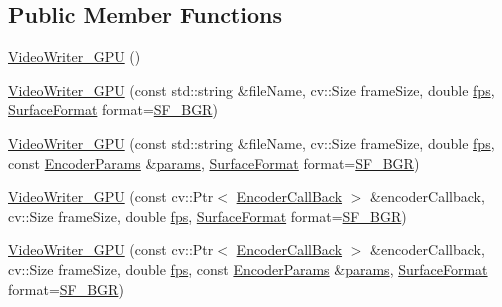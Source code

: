 \subsection*{Public Member Functions}
\begin{DoxyCompactItemize}
\item 
\hyperlink{classcv_1_1gpu_1_1VideoWriter__GPU_a79dc0841ea1d709707c4c2dde8bb725c}{Video\-Writer\-\_\-\-G\-P\-U} ()
\item 
\hyperlink{classcv_1_1gpu_1_1VideoWriter__GPU_a97be453ffdabdc7e8b0e920ec0282e05}{Video\-Writer\-\_\-\-G\-P\-U} (const std\-::string \&file\-Name, cv\-::\-Size frame\-Size, double \hyperlink{highgui__c_8h_adbca5b692e9ace76ccf02d9c621ee228}{fps}, \hyperlink{classcv_1_1gpu_1_1VideoWriter__GPU_ada559c518c52735d64366823e897e8db}{Surface\-Format} format=\hyperlink{classcv_1_1gpu_1_1VideoWriter__GPU_ada559c518c52735d64366823e897e8dba7177ece8afd220ce60266029e5b12da8}{S\-F\-\_\-\-B\-G\-R})
\item 
\hyperlink{classcv_1_1gpu_1_1VideoWriter__GPU_a886f388a86fc1858d76cb2c67f44e6ea}{Video\-Writer\-\_\-\-G\-P\-U} (const std\-::string \&file\-Name, cv\-::\-Size frame\-Size, double \hyperlink{highgui__c_8h_adbca5b692e9ace76ccf02d9c621ee228}{fps}, const \hyperlink{structcv_1_1gpu_1_1VideoWriter__GPU_1_1EncoderParams}{Encoder\-Params} \&\hyperlink{compat_8hpp_a0480a03ecc41b20cde376602531d9270}{params}, \hyperlink{classcv_1_1gpu_1_1VideoWriter__GPU_ada559c518c52735d64366823e897e8db}{Surface\-Format} format=\hyperlink{classcv_1_1gpu_1_1VideoWriter__GPU_ada559c518c52735d64366823e897e8dba7177ece8afd220ce60266029e5b12da8}{S\-F\-\_\-\-B\-G\-R})
\item 
\hyperlink{classcv_1_1gpu_1_1VideoWriter__GPU_a095d627b9a7903ae45292483d2108947}{Video\-Writer\-\_\-\-G\-P\-U} (const cv\-::\-Ptr$<$ \hyperlink{classcv_1_1gpu_1_1VideoWriter__GPU_1_1EncoderCallBack}{Encoder\-Call\-Back} $>$ \&encoder\-Callback, cv\-::\-Size frame\-Size, double \hyperlink{highgui__c_8h_adbca5b692e9ace76ccf02d9c621ee228}{fps}, \hyperlink{classcv_1_1gpu_1_1VideoWriter__GPU_ada559c518c52735d64366823e897e8db}{Surface\-Format} format=\hyperlink{classcv_1_1gpu_1_1VideoWriter__GPU_ada559c518c52735d64366823e897e8dba7177ece8afd220ce60266029e5b12da8}{S\-F\-\_\-\-B\-G\-R})
\item 
\hyperlink{classcv_1_1gpu_1_1VideoWriter__GPU_a99f7dbfdf096788ce1c542d94739acca}{Video\-Writer\-\_\-\-G\-P\-U} (const cv\-::\-Ptr$<$ \hyperlink{classcv_1_1gpu_1_1VideoWriter__GPU_1_1EncoderCallBack}{Encoder\-Call\-Back} $>$ \&encoder\-Callback, cv\-::\-Size frame\-Size, double \hyperlink{highgui__c_8h_adbca5b692e9ace76ccf02d9c621ee228}{fps}, const \hyperlink{structcv_1_1gpu_1_1VideoWriter__GPU_1_1EncoderParams}{Encoder\-Params} \&\hyperlink{compat_8hpp_a0480a03ecc41b20cde376602531d9270}{params}, \hyperlink{classcv_1_1gpu_1_1VideoWriter__GPU_ada559c518c52735d64366823e897e8db}{Surface\-Format} format=\hyperlink{classcv_1_1gpu_1_1VideoWriter__GPU_ada559c518c52735d64366823e897e8dba7177ece8afd220ce60266029e5b12da8}{S\-F\-\_\-\-B\-G\-R})

\end{DoxyCompactItemize}
